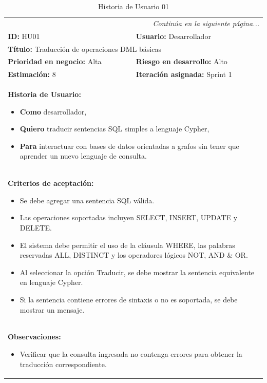 \begin{longtable}[c]{|m{}|m{}|}
    \caption{Historia de Usuario 01}
    \label{tab:hu01} \\
    
    \hline
    \endfirsthead
    \endhead
    \multicolumn{2}{r}{\textit{Continúa en la siguiente página...}} \\
    \endfoot
    \endlastfoot

    \textbf{ID:} HU01 & \textbf{Usuario:} Desarrollador \\
    \hline
    \multicolumn{2}{|l|}{\textbf{Título:} Traducción de operaciones DML básicas} \\
    \hline
    \textbf{Prioridad en negocio:} Alta & \textbf{Riesgo en desarrollo:} Alto \\
    \hline
    \textbf{Estimación:} 8 & \textbf{Iteración asignada:} Sprint 1 \\
    \hline
    \multicolumn{2}{|p{0.92\textwidth}|}{
        \textbf{Historia de Usuario:}
        \begin{itemize}[nosep, leftmargin=0.35cm, label={}, after=\vspace{0.5em}]
            \item \textbf{Como} desarrollador,
            \item \textbf{Quiero} traducir sentencias SQL simples a lenguaje Cypher,
            \item \textbf{Para} interactuar con bases de datos orientadas a grafos sin tener que aprender un nuevo lenguaje de consulta.
        \end{itemize}} \\
    \hline
    \multicolumn{2}{|p{0.92\textwidth}|}{
        \textbf{Criterios de aceptación:} 
        \begin{itemize}[nosep, leftmargin=0.75cm, after=\vspace{0.5em}]
            \item Se debe agregar una sentencia SQL válida.
            \item Las operaciones soportadas incluyen SELECT, INSERT, UPDATE y DELETE.
            \item El sistema debe permitir el uso de la cláusula WHERE, las palabras reservadas ALL, DISTINCT y los operadores lógicos NOT, AND \& OR.
            \item Al seleccionar la opción Traducir, se debe mostrar la sentencia equivalente en lenguaje Cypher.
            \item Si la sentencia contiene errores de sintaxis o no es soportada, se debe mostrar un mensaje.
        \end{itemize}} \\
    \hline
    \multicolumn{2}{|p{0.92\textwidth}|}{
        \textbf{Observaciones:}
        \begin{itemize}[nosep, leftmargin=0.75cm, after=\vspace{0.5em}]
            \item Verificar que la consulta ingresada no contenga errores para obtener la traducción correspondiente.
        \end{itemize}} \\
    \hline
\end{longtable}